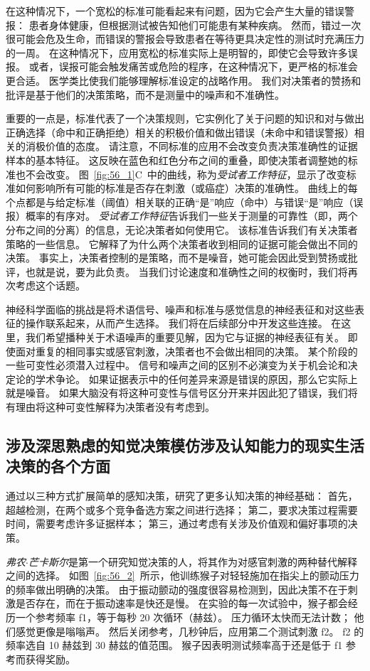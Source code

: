 在这种情况下，一个宽松的标准可能看起来有问题，因为它会产生大量的错误警报：
患者身体健康，但根据测试被告知他们可能患有某种疾病。
然而，错过一次很可能会危及生命，而错误的警报会导致患者在等待更具决定性的测试时充满压力的一周。
在这种情况下，应用宽松的标准实际上是明智的，即使它会导致许多误报。
或者，误报可能会触发痛苦或危险的程序，在这种情况下，更严格的标准会更合适。
医学类比使我们能够理解标准设定的战略作用。
我们对决策者的赞扬和批评是基于他们的决策策略，而不是测量中的噪声和不准确性。


重要的一点是，标准代表了一个决策规则，它实例化了关于问题的知识和对与做出正确选择（命中和正确拒绝）相关的积极价值和做出错误（未命中和错误警报）相关的消极价值的态度。
请注意，不同标准的应用不会改变负责决策准确性的证据样本的基本特征。
这反映在蓝色和红色分布之间的重叠，即使决策者调整她的标准也不会改变。
图~\ref{fig:56_1}C~中的曲线，称为\textit{受试者工作特征}，显示了改变标准如何影响所有可能的标准是否存在刺激（或癌症）决策的准确性。
曲线上的每个点都是与给定标准（阈值）相关联的正确“是”响应（命中）与错误“是”响应（误报）概率的有序对。
\textit{受试者工作特征}告诉我们一些关于测量的可靠性（即，两个分布之间的分离）的信息，无论决策者如何使用它。
该标准告诉我们有关决策者策略的一些信息。
它解释了为什么两个决策者收到相同的证据可能会做出不同的决策。
事实上，决策者控制的是策略，而不是噪音，她可能会因此受到赞扬或批评，也就是说，要为此负责。
当我们讨论速度和准确性之间的权衡时，我们将再次考虑这个话题。


神经科学面临的挑战是将术语信号、噪声和标准与感觉信息的神经表征和对这些表征的操作联系起来，从而产生选择。
我们将在后续部分中开发这些连接。
在这里，我们希望播种关于术语噪声的重要见解，因为它与证据的神经表征有关。
即使面对重复的相同事实或感官刺激，决策者也不会做出相同的决策。
某个阶段的一些可变性必须潜入过程中。
信号和噪声之间的区别不必演变为关于机会论和决定论的学术争论。
如果证据表示中的任何差异来源是错误的原因，那么它实际上就是噪音。
如果大脑没有将这种可变性与信号区分开来并因此犯了错误，我们将有理由将这种可变性解释为决策者没有考虑到。


\subsection{涉及深思熟虑的知觉决策模仿涉及认知能力的现实生活决策的各个方面}

通过以三种方式扩展简单的感知决策，研究了更多认知决策的神经基础：
首先，超越检测，在两个或多个竞争备选方案之间进行选择；
第二，要求决策过程需要时间，需要考虑许多证据样本； 第三，通过考虑有关涉及价值观和偏好事项的决策。


\textit{弗农$\cdot$芒卡斯尔}是第一个研究知觉决策的人，将其作为对感官刺激的两种替代解释之间的选择。
如图~\ref{fig:56_2}~所示，他训练猴子对轻轻施加在指尖上的颤动压力的频率做出明确的决策。
由于振动颤动的强度很容易检测到，因此决策不在于刺激是否存在，而在于振动速率是快还是慢。
在实验的每一次试验中，猴子都会经历一个参考频率 f1，等于每秒 20 次循环（赫兹）。
压力循环太快而无法计数； 他们感觉更像是嗡嗡声。
然后关闭参考，几秒钟后，应用第二个测试刺激 f2。
f2 的频率选自 10 赫兹到 30 赫兹的值范围。
猴子因表明测试频率高于还是低于 f1 参考而获得奖励。


